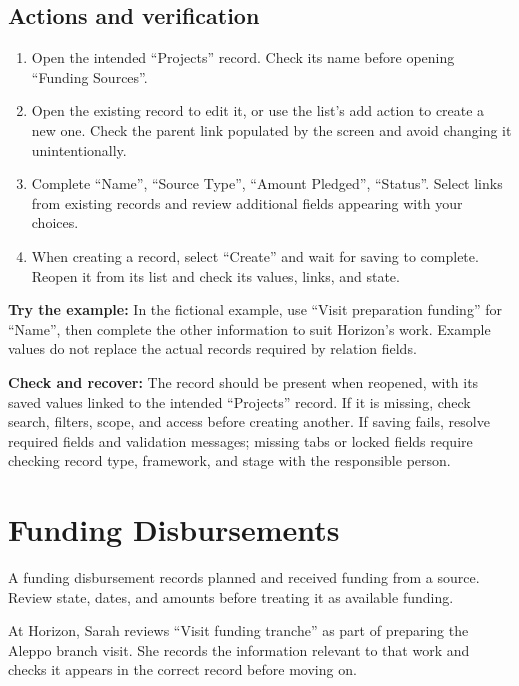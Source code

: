 \subsection{Actions and verification}
\begin{enumerate}
\item Open the intended “Projects” record. Check its name before opening “Funding Sources”.
\item Open the existing record to edit it, or use the list's add action to create a new one. Check the parent link populated by the screen and avoid changing it unintentionally.
\item Complete “Name”, “Source Type”, “Amount Pledged”, “Status”. Select links from existing records and review additional fields appearing with your choices.
\item When creating a record, select “Create” and wait for saving to complete. Reopen it from its list and check its values, links, and state.
\end{enumerate}

\textbf{Try the example:} In the fictional example, use “Visit preparation funding” for “Name”, then complete the other information to suit Horizon's work. Example values do not replace the actual records required by relation fields.

\textbf{Check and recover:} The record should be present when reopened, with its saved values linked to the intended “Projects” record. If it is missing, check search, filters, scope, and access before creating another. If saving fails, resolve required fields and validation messages; missing tabs or locked fields require checking record type, framework, and stage with the responsible person.

\clearpage
\section{Funding Disbursements}
\label{sec:projects-feature-funding-disbursements}

A funding disbursement records planned and received funding from a source. Review state, dates, and amounts before treating it as available funding.

\begin{rcnote}
At Horizon, Sarah reviews “Visit funding tranche” as part of preparing the Aleppo branch visit. She records the information relevant to that work and checks it appears in the correct record before moving on.
\end{rcnote}

